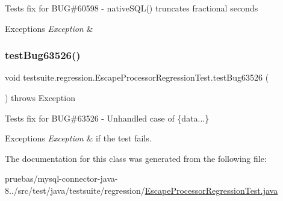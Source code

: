 Tests fix for B\+UG\#60598 -\/ native\+S\+Q\+L() truncates fractional seconds


\begin{DoxyExceptions}{Exceptions}
{\em Exception} & \\
\hline
\end{DoxyExceptions}
\mbox{\label{classtestsuite_1_1regression_1_1_escape_processor_regression_test_a372b0f782e66be889f1351b24530cdc0}} 
\subsubsection{\texorpdfstring{test\+Bug63526()}{testBug63526()}}
{\footnotesize\ttfamily void testsuite.\+regression.\+Escape\+Processor\+Regression\+Test.\+test\+Bug63526 (\begin{DoxyParamCaption}{ }\end{DoxyParamCaption}) throws Exception}

Tests fix for B\+UG\#63526 -\/ Unhandled case of \{data...\}


\begin{DoxyExceptions}{Exceptions}
{\em Exception} & if the test fails. \\
\hline
\end{DoxyExceptions}


The documentation for this class was generated from the following file\+:\begin{DoxyCompactItemize}
\item 
pruebas/mysql-\/connector-\/java-\/8../src/test/java/testsuite/regression/\mbox{\hyperlink{_escape_processor_regression_test_8java}{Escape\+Processor\+Regression\+Test.\+java}}\end{DoxyCompactItemize}
